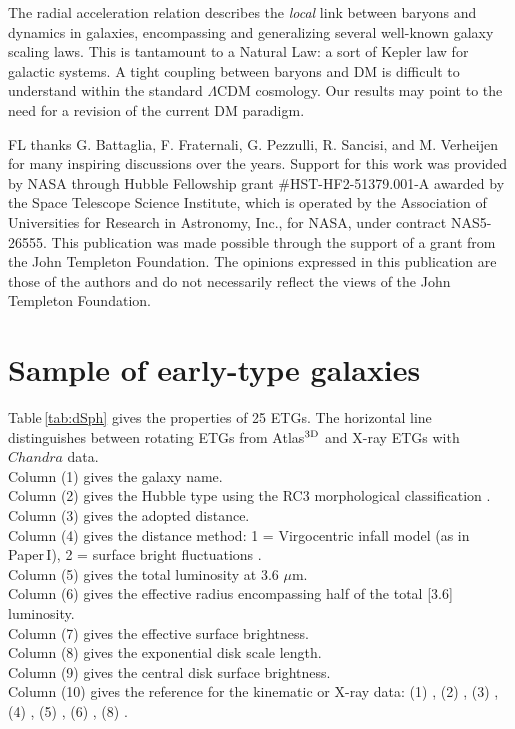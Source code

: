\documentclass[apjl, twocolappendix]{emulateapj}
\begin{document}
The radial acceleration relation describes the \textit{local} link between baryons and dynamics in galaxies, encompassing and generalizing several well-known galaxy scaling laws. This is tantamount to a Natural Law: a sort of Kepler law for galactic systems. A tight coupling between baryons and DM is difficult to understand within the standard $\Lambda$CDM cosmology. Our results may point to the need for a revision of the current DM paradigm.

\acknowledgments

FL thanks G. Battaglia, F. Fraternali, G. Pezzulli, R. Sancisi, and M. Verheijen for many inspiring discussions over the years. Support for this work was provided by NASA through Hubble Fellowship grant \#HST-HF2-51379.001-A awarded by the Space Telescope Science Institute, which is operated by the Association of Universities for Research in Astronomy, Inc., for NASA, under contract NAS5-26555. This publication was made possible through the support of a grant from the John Templeton  Foundation. The opinions expressed in this publication are those of the authors and do not necessarily reflect the views of the John Templeton Foundation.

\appendix



\section{Sample of early-type galaxies}\label{app:ETG}

Table\,\ref{tab:dSph} gives the properties of 25 ETGs. The horizontal line distinguishes between rotating ETGs from Atlas$^{\rm 3D}$ and X-ray ETGs with $Chandra$ data.\\
Column (1) gives the galaxy name.\\
Column (2) gives the Hubble type using the RC3 morphological classification \citep{RC3}.\\
Column (3) gives the adopted distance.\\
Column (4) gives the distance method: 1 = Virgocentric infall model (as in Paper\,I), 2 = surface bright fluctuations \citep[taken from][]{Tully2013}.\\
Column (5) gives the total luminosity at 3.6 $\mu$m.\\
Column (6) gives the effective radius encompassing half of the total [3.6] luminosity.\\
Column (7) gives the effective surface brightness.\\
Column (8) gives the exponential disk scale length.\\
Column (9) gives the central disk surface brightness.\\
Column (10) gives the reference for the kinematic or X-ray data: (1) \citet{Serra2016}, (2) \citet{Weijmans2008}, (3) \citet{Humphrey2011}, (4) \citet{Humphrey2009}, (5) \citet{Humphrey2006}, (6) \citet{Humphrey2012}, (8) \citet{Humphrey2008}.
\end{document}
